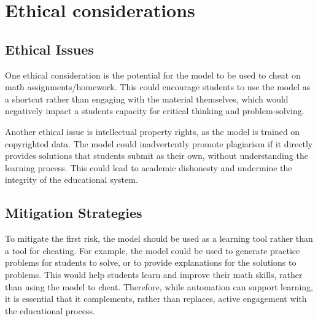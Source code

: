 \documentclass{article}
\begin{document}

\section{Ethical considerations}



\subsection{Ethical Issues}
One ethical consideration is the potential for the model to be used to cheat on math assignments/homework. This could encourage students to use the model as a shortcut rather than engaging with the material themselves, which would negatively impact a students capacity for critical thinking and problem-solving. 

Another ethical issue is intellectual property rights, as the model is trained on copyrighted data. The model could inadvertently promote plagiarism if it directly provides solutions that students submit as their own, without understanding the learning process. This could lead to academic dishonesty and undermine the integrity of the educational system.

\subsection{Mitigation Strategies}
To mitigate the first risk, the model should be used as a learning tool rather than a tool for cheating. For example, the model could be used to generate practice problems for students to solve, or to provide explanations for the solutions to problems. This would help students learn and improve their math skills, rather than using the model to cheat. Therefore, while automation can support learning, it is essential that it complements, rather than replaces, active engagement with the educational process.
\end{document}
